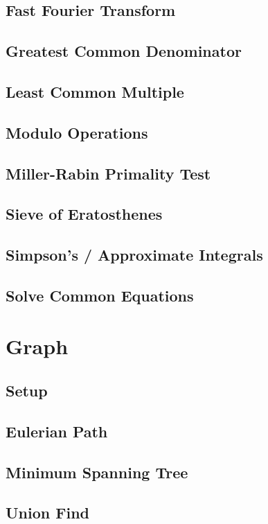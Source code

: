 \documentclass[landscape, 10pt]{article}
\begin{document}
\begin{multicols}{4}
\subsection{Fast Fourier Transform}

\subsection{Greatest Common Denominator}

\subsection{Least Common Multiple}

\subsection{Modulo Operations}

\subsection{Miller-Rabin Primality Test}

\subsection{Sieve of Eratosthenes}

\subsection{Simpson's / Approximate Integrals}

\subsection{Solve Common Equations}


\section{Graph}
\subsection{Setup}

\subsection{Eulerian Path}

\subsection{Minimum Spanning Tree}

\subsection{Union Find}



\end{multicols}
\end{document}
